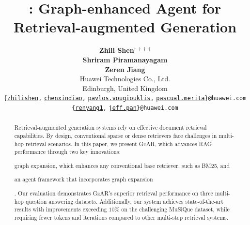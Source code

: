 \documentclass[11pt]{article}
\title{\gear: Graph-enhanced Agent for Retrieval-augmented Generation}
\author{{\bf Zhili Shen}$^{\mathbf{\dagger}}$ \quad {\bf Chenxin Diao}$^{\mathbf{\dagger}}$ \quad {\bf Pavlos Vougiouklis}$^{\mathbf{\dagger}}$ \quad {\bf Pascual Merita}$^{\mathbf{\dagger}}$ \\
{\bf Shriram Piramanayagam} \quad {\bf Damien Graux} \quad {\bf Dandan Tu}\\ {\bf Zeren Jiang} \quad {\bf Ruofei Lai} \quad {\bf Yang Ren} \quad \quad {\bf Jeff Z. Pan}\\ 
Huawei Technologies Co., Ltd.
\\Edinburgh, United Kingdom\\\texttt{\{}{\href{mailto:zhilishen@huawei.com}{\texttt{zhilishen}}}\texttt{,} 
\href{mailto:chenxindiao@huawei.com}{\texttt{chenxindiao}}\texttt{,} \href{mailto:pavlos.vougiouklis@huawei.com}{\texttt{pavlos.vougiouklis}}\texttt{,}
\href{mailto:pascual.merita@h-partners.com}{\texttt{pascual.merita}}\texttt{\}@huawei.com}\\\texttt{\{}{\href{mailto:renyang1@huawei.com}{\texttt{renyang1}}}\texttt{,} 
\href{mailto:jeff.pan@huawei.com}{\texttt{jeff.pan}}\texttt{\}@huawei.com}\\
}
\newcommand{\gear}{\textsc{GeAR}\xspace}
\begin{document}
\maketitle
\begin{abstract}
Retrieval-augmented generation systems rely on effective document retrieval capabilities. By design, conventional sparse or dense retrievers face challenges in multi-hop retrieval scenarios. In this paper, we present \gear, which advances RAG performance through two key innovations: \begin{inparaenum}[(i)] \item graph expansion, which enhances any conventional base retriever, such as BM25, and \item an agent framework that incorporates graph expansion\end{inparaenum}. Our evaluation demonstrates \gear 's superior retrieval performance on three multi-hop question answering datasets. Additionally, our system achieves state-of-the-art results with improvements exceeding $10\%$ on the challenging MuSiQue dataset, while requiring fewer tokens and iterations compared to other multi-step retrieval systems.  
\end{abstract}
\renewcommand{\thefootnote}
{\fnsymbol{footnote}}
\setcounter{footnote}{2}
\renewcommand{\thefootnote}
{\arabic{footnote}}
\setcounter{footnote}{0}











\appendix









\end{document}

